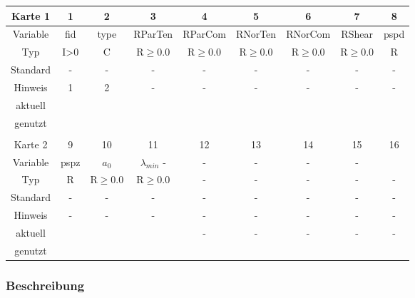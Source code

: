 \documentclass[11pt,titlepage,listof=totoc,bibliography=totoc,twoside]{scrreprt}
\begin{document}
{{\begin{table}[htbp]
\centering
\begin{tabularx}{\textwidth}{cCCCCCCCC}
\toprule
Karte 1	& 1		& 2		& 3		& 4		& 5		& 6		& 7		& 8		\\
\midrule
Variable& fid		& type		& RParTen	& RParCom	& RNorTen	& RNorCom	& RShear	& pspd		\\
Typ	& I>0		& C		& R$\ge$0.0	& R$\ge$0.0	& R$\ge$0.0	& R$\ge$0.0	& R$\ge$0.0	& R		\\
Standard& -		& -		& -		& -		& -		& -		& -		& -		\\
Hinweis	& 1		& 2		& -		& -		& -		& -		& -		& -		\\
aktuell	& 	& 	& 	& 	& 	& 	& 	& 	\\
genutzt \\
\\
Karte 2	& 9		& 10		& 11		& 12		& 13		& 14		& 15		& 16		\\
\midrule
Variable& pspz		& $a_0$		& $\lambda_{min}$ -		& -		& -		& -		& -		\\
Typ	& R		& R$\ge$0.0	& R$\ge$0.0	& -		& -		& -		& -		& -		\\
Standard& -		& -		& -		& -		& -		& -		& -		& -		\\
Hinweis	& -		& -		& -		& -		& -		& -		& -		& -		\\
aktuell	& 	& 	& 	& 	& 	& \multirow{2}{*}{-}	& 	& 	\\
genutzt \\
\bottomrule
\end{tabularx}
\end{table}

\subsubsection{Beschreibung}

}}
\end{document}
